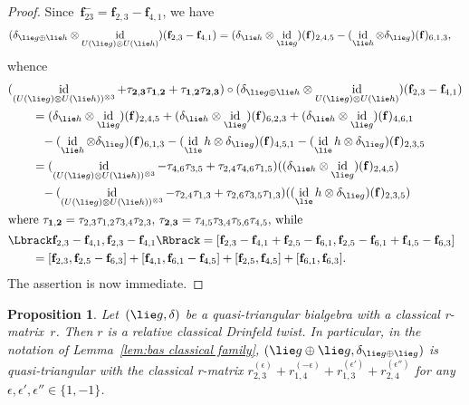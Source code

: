 \documentclass[12pt, reqno]{amsart}
\newcommand{\cybe}[1]{\mathbb{\Lbrack}#1,#1\mathbb{\Rbrack}}
\newtheorem{proposition}[theorem]{Proposition}
\theoremstyle{definition}
\numberwithin{equation}{section}
\newcommand{\tensor}{\otimes}
\DeclareMathOperator{\id}{id}
\begin{document}
\begin{proof}
Since~$\mathbf f_{23}^-=\mathbf f_{2,3}-\mathbf f_{4,1}$, we have 
\begin{align*}
(\delta_{\lie g\oplus\lie h}&\tensor\id_{U(\lie g)\tensor U(\lie h)})(\mathbf f_{2,3}-\mathbf f_{4,1})
=(\delta_{\lie h}\tensor \id_{\lie g})(\mathbf f)_{2,4,5}-
(\id_{\lie h}\tensor\delta_{\lie g})(\mathbf f)_{6,1,3},
\end{align*}
whence
\begin{align*}
&(\id_{(U(\lie g)\tensor U(\lie h))^{\tensor3}}+\tau_{\mathbf 2,\mathbf 3}\tau_{\mathbf 1,\mathbf 2}+\tau_{\mathbf 1,\mathbf 2}\tau_{\mathbf 2,\mathbf 3})\circ
(\delta_{\lie g\oplus\lie h}\tensor\id_{U(\lie g)\tensor U(\lie h)})(\mathbf f_{2,3}-\mathbf f_{4,1})
\\
&\qquad=(\delta_{\lie h}\tensor \id_{\lie g})(\mathbf f)_{2,4,5}
+(\delta_{\lie h}\tensor \id_{\lie g})(\mathbf f)_{6,2,3}
+(\delta_{\lie h}\tensor \id_{\lie g})(\mathbf f)_{4,6,1}\\
&\qquad\phantom{=}-
(\id_{\lie h}\tensor\delta_{\lie g})(\mathbf f)_{6,1,3}
-(\id_\lie h\tensor\delta_{\lie g})(\mathbf f)_{4,5,1}-(\id_\lie h\tensor\delta_{\lie g})(\mathbf f)_{2,3,5}\\
&\qquad=
(\id_{(U(\lie g)\tensor U(\lie h))^{\tensor3}}-\tau_{4,6}\tau_{3,5}+\tau_{2,4}\tau_{4,6}\tau_{1,5})((\delta_{\lie h}\tensor \id_{\lie g})(\mathbf f)_{2,4,5})
\\
&\qquad\phantom{=}-(\id_{(U(\lie g)\tensor U(\lie h))^{\tensor3}}-\tau_{2,4}\tau_{1,3}+\tau_{2,6}\tau_{3,5}\tau_{1,3})((\id_\lie h\tensor\delta_{\lie g})(\mathbf f)_{2,3,5})
\\
\intertext{where $\tau_{\mathbf 1,\mathbf 2}=\tau_{2,3}\tau_{1,2}\tau_{3,4}\tau_{2,3}$,
$\tau_{\mathbf 2,\mathbf 3}=\tau_{4,5}\tau_{3,4}\tau_{5,6}\tau_{4,5}$,
while}
&\cybe{\mathbf f_{2,3}-\mathbf f_{4,1}}=
[\mathbf f_{2,3}-\mathbf f_{4,1}+\mathbf f_{2,5}-\mathbf f_{6,1},
\mathbf f_{2,5}-\mathbf f_{6,1}+\mathbf f_{4,5}-\mathbf f_{6,3}]\\
&\qquad=[\mathbf f_{2,3},\mathbf f_{2,5}-\mathbf f_{6,3}]
+[\mathbf f_{4,1},\mathbf f_{6,1}-\mathbf f_{4,5}]+
[\mathbf f_{2,5},\mathbf f_{4,5}]+[\mathbf f_{6,1},\mathbf f_{6,3}].
\end{align*}
The assertion is now immediate.
\end{proof}
\begin{proposition}\label{prop:basic twist class}
Let~$(\lie g,\delta)$ be a quasi-triangular bialgebra with a classical r-matrix~$r$. Then $r$ is a relative classical Drinfeld twist.
In particular, in the notation of Lemma~\ref{lem:bas classical family},
$(\lie g\oplus\lie g,\delta_{\lie g\oplus\lie g})$ is quasi-triangular 
with the classical r-matrix $r_{2,3}^{(\epsilon)}+r_{1,4}^{(-\epsilon)}+r_{1,3}^{(\epsilon')}+r_{2,4}^{(\epsilon'')}$
for any~$\epsilon,\epsilon',\epsilon''\in \{1,-1\}$.
\end{proposition}
\end{document}
